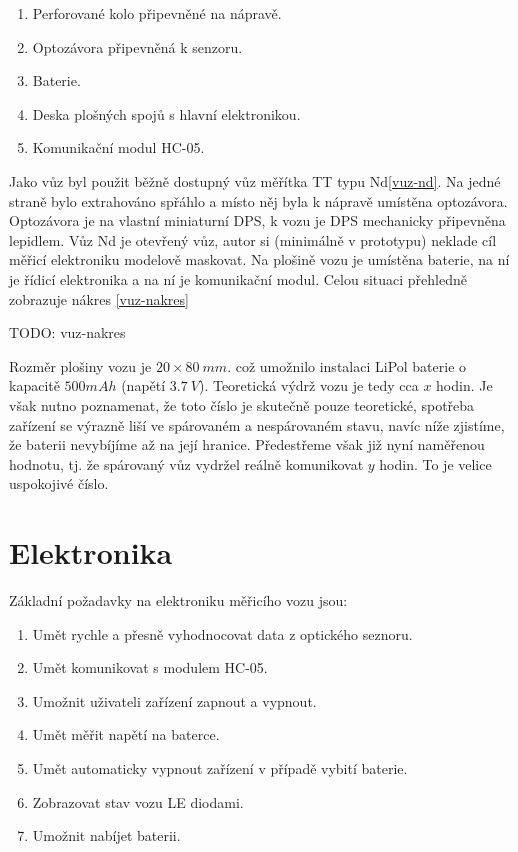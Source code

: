 \begin{enumerate}
\item Perforované kolo připevněné na nápravě.
\item Optozávora připevněná k senzoru.
\item Baterie.
\item Deska plošných spojů s hlavní elektronikou.
\item Komunikační modul HC-05.
\end{enumerate}

Jako vůz byl použit běžně dostupný vůz měřítka TT typu Nd\ref{vuz-nd}. Na
jedné straně bylo extrahováno spřáhlo a místo něj byla k nápravě umístěna
optozávora. Optozávora je na vlastní miniaturní DPS, k vozu je DPS mechanicky
připevněna lepidlem. Vůz Nd je otevřený vůz, autor si (minimálně v prototypu)
neklade cíl měřicí elektroniku modelově maskovat. Na plošině vozu je umístěna
baterie, na ní je řídicí elektronika a na ní je komunikační modul. Celou
situaci přehledně zobrazuje nákres \ref{vuz-nakres}

TODO: vuz-nakres

Rozměr plošiny vozu je $20\times80\ mm$. což umožnilo instalaci LiPol baterie
o kapacitě $500 mAh$ (napětí $3.7\ V$). Teoretická výdrž vozu je tedy cca $x$
hodin. Je však nutno poznamenat, že toto číslo je skutečně pouze teoretické,
spotřeba zařízení se výrazně liší ve spárovaném a nespárovaném stavu, navíc
níže zjistíme, že baterii nevybíjíme až na její hranice. Předestřeme však již
nyní naměřenou hodnotu, tj. že spárovaný vůz vydržel reálně komunikovat
$y$ hodin. To je velice uspokojivé číslo.

\section{Elektronika}

Základní požadavky na elektroniku měřicího vozu jsou:

\begin{enumerate}
\item Umět rychle a přesně vyhodnocovat data z optického seznoru.
\item Umět komunikovat s modulem HC-05.
\item Umožnit uživateli zařízení zapnout a vypnout.
\item Umět měřit napětí na baterce.
\item Umět automaticky vypnout zařízení v případě vybití baterie.
\item Zobrazovat stav vozu LE diodami.
\item Umožnit nabíjet baterii.
\end{enumerate}

